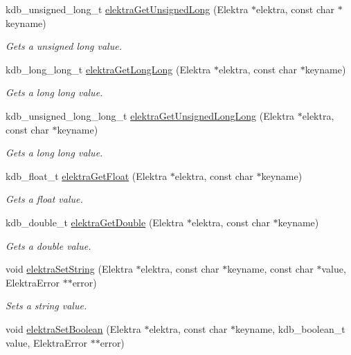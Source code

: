 \begin{DoxyCompactItemize}
kdb\+\_\+unsigned\+\_\+long\+\_\+t \mbox{\hyperlink{group__highlevel_gabd5a96b1c280fcf74509b1262ee339b6}{elektra\+Get\+Unsigned\+Long}} (Elektra $\ast$elektra, const char $\ast$keyname)
\begin{DoxyCompactList}\small\item\em Gets a unsigned long value. \end{DoxyCompactList}\item 
kdb\+\_\+long\+\_\+long\+\_\+t \mbox{\hyperlink{group__highlevel_ga6085eb6cbf16ce5e7b0b64db0f77efea}{elektra\+Get\+Long\+Long}} (Elektra $\ast$elektra, const char $\ast$keyname)
\begin{DoxyCompactList}\small\item\em Gets a long long value. \end{DoxyCompactList}\item 
kdb\+\_\+unsigned\+\_\+long\+\_\+long\+\_\+t \mbox{\hyperlink{group__highlevel_gadfb09825268f0b9215d7bb27c4068e4d}{elektra\+Get\+Unsigned\+Long\+Long}} (Elektra $\ast$elektra, const char $\ast$keyname)
\begin{DoxyCompactList}\small\item\em Gets a long long value. \end{DoxyCompactList}\item 
kdb\+\_\+float\+\_\+t \mbox{\hyperlink{group__highlevel_gab7cb28352ab7a503c232c5dbff45ddde}{elektra\+Get\+Float}} (Elektra $\ast$elektra, const char $\ast$keyname)
\begin{DoxyCompactList}\small\item\em Gets a float value. \end{DoxyCompactList}\item 
kdb\+\_\+double\+\_\+t \mbox{\hyperlink{group__highlevel_ga878f4ef3ecbfacca6afbdb97c1da7943}{elektra\+Get\+Double}} (Elektra $\ast$elektra, const char $\ast$keyname)
\begin{DoxyCompactList}\small\item\em Gets a double value. \end{DoxyCompactList}\item 
void \mbox{\hyperlink{group__highlevel_ga563a695658e8e6f74183cca674edd1a7}{elektra\+Set\+String}} (Elektra $\ast$elektra, const char $\ast$keyname, const char $\ast$value, Elektra\+Error $\ast$$\ast$error)
\begin{DoxyCompactList}\small\item\em Sets a string value. \end{DoxyCompactList}\item 
void \mbox{\hyperlink{group__highlevel_ga3d703756b43b1ca85296f894e80e22e2}{elektra\+Set\+Boolean}} (Elektra $\ast$elektra, const char $\ast$keyname, kdb\+\_\+boolean\+\_\+t value, Elektra\+Error $\ast$$\ast$error)

\end{DoxyCompactItemize}
